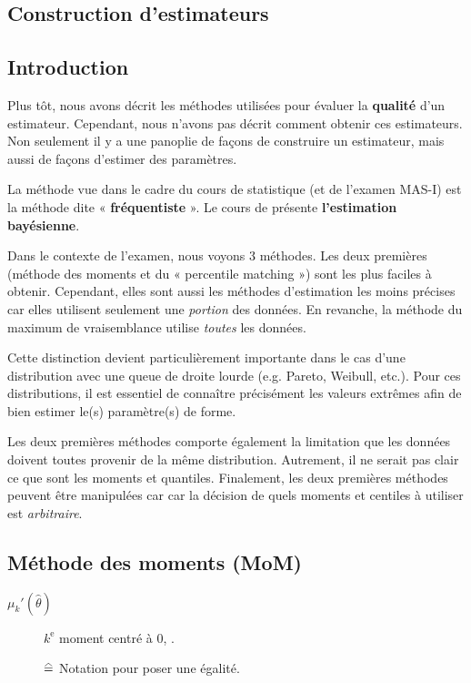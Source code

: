 \documentclass[french]{article}
\begin{document}
\begin{multicols*}{2}
\newpage
\section{Construction d'estimateurs}
\subsection{Introduction}
\begin{rappel_enhanced}[Contexte]
Plus tôt, nous avons décrit les méthodes utilisées pour évaluer la \textbf{qualité} d'un estimateur. Cependant, nous n'avons pas décrit comment obtenir ces estimateurs. Non seulement il y a une panoplie de façons de construire un estimateur, mais aussi de façons d'estimer des paramètres.

\bigskip

La méthode vue dans le cadre du cours de statistique (et de l'examen MAS-I) est la méthode dite « \textbf{fréquentiste} ». Le cours de  présente \textbf{l'estimation bayésienne}.
\end{rappel_enhanced}


Dans le contexte de l'examen, nous voyons 3 méthodes. Les deux premières (méthode des moments et du « percentile matching ») sont les plus faciles à obtenir. Cependant, elles sont aussi les méthodes d'estimation les moins précises car elles utilisent seulement une \textit{portion} des données. En revanche, la méthode du maximum de vraisemblance utilise \textit{toutes} les données.	

\bigskip

Cette distinction devient particulièrement importante dans le cas d'une distribution avec une queue de droite lourde (e.g. Pareto, Weibull, etc.). Pour ces distributions, il est essentiel de connaître  précisément les valeurs extrêmes afin de bien estimer le(s) paramètre(s) de forme.	

\bigskip

Les deux premières méthodes comporte également la limitation que les données doivent toutes provenir de la même distribution. Autrement, il ne serait pas clair ce que sont les moments et quantiles. Finalement, les deux premières méthodes peuvent être manipulées car car la décision de quels moments et centiles à utiliser est \textit{arbitraire}.



\columnbreak
\subsection{Méthode des moments (MoM)}
\begin{distributions}[Terminologie]
\begin{description}
	\item[$\mu_{k}'(\hat{\theta})$]	$k^{\text{e}}$ moment centré à 0, .
	\item[]	$\equalhat$	Notation pour poser une égalité.
\end{description}
\end{distributions}



\end{multicols*}
\end{document}
